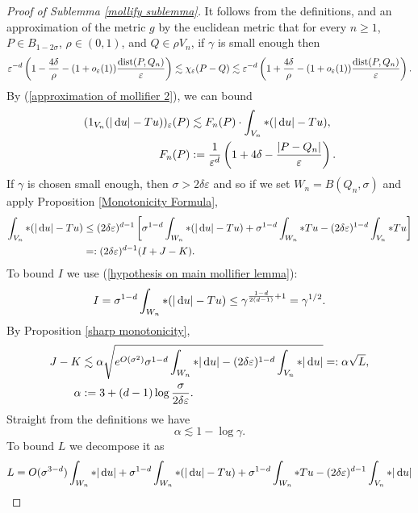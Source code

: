 \begin{proof}[Proof of Sublemma \ref{mollify sublemma}]
It follows from the definitions, and an approximation of the metric $g$ by the euclidean metric that for every $n \geq 1$, $P \in B_{1 - 2\sigma}$, $\rho \in (0, 1)$, and $Q \in \rho V_n$, if $\gamma$ is small enough then
\begin{equation}\label{approximation of mollifier 2}
\varepsilon^{-d}\left(1 - \frac{4\delta}{\rho} - (1 + o_\varepsilon(1))\frac{\operatorname{dist}(P, Q_n)}{\varepsilon}\right) \lesssim \chi_\varepsilon(P - Q) \lesssim \varepsilon^{-d}\left(1 + \frac{4\delta}{\rho} - (1 + o_\varepsilon(1))\frac{\operatorname{dist}(P, Q_n)}{\varepsilon}\right).
\end{equation}
By (\ref{approximation of mollifier 2}), we can bound
\begin{align*}
(1_{V_n}(|\mathop{}\!\mathrm{d} u| - Tu))_\varepsilon(P) &\lesssim F_n(P) \cdot \int_{V_n} *(|\mathop{}\!\mathrm{d} u| - Tu), \\
F_n(P) &:= \frac{1}{\varepsilon^d}\left(1 + 4\delta - \frac{|P - Q_n|}{\varepsilon}\right).
\end{align*}
If $\gamma$ is chosen small enough, then $\sigma > 2\delta\varepsilon$ and so if we set $W_n = B(Q_n, \sigma)$ and apply Proposition \ref{Monotonicity Formula},
\begin{align*}
\int_{V_n} *(|\mathop{}\!\mathrm{d} u| - Tu) &\leq (2\delta\varepsilon)^{d - 1}
 \left[\sigma^{1 - d}\int_{W_n} *(|\mathop{}\!\mathrm{d} u| - Tu) + \sigma^{1 - d}\int_{W_n} *Tu - (2\delta\varepsilon)^{1 - d}\int_{V_n} *Tu\right]\\
 &=: (2\delta\varepsilon)^{d - 1} (I + J - K).
\end{align*}
To bound $I$ we use (\ref{hypothesis on main mollifier lemma}):
$$I = \sigma^{1 - d}\int_{W_n} *(|\mathop{}\!\mathrm{d} u| - Tu) \leq \gamma^{\frac{1 - d}{2(d - 1)} + 1} = \gamma^{1/2}.$$
By Proposition \ref{sharp monotonicity},
\begin{align*}
J - K &\lesssim \alpha \sqrt{e^{O(\sigma^2)}\sigma^{1 - d} \int_{W_n} *|\mathop{}\!\mathrm{d} u| - (2\delta\varepsilon)^{1 - d} \int_{V_n} *|\mathop{}\!\mathrm{d} u|} =: \alpha \sqrt L,\\
\alpha &:= 3 + (d - 1) \log \frac{\sigma}{2\delta\varepsilon}.
\end{align*}
Straight from the definitions we have
$$\alpha \lesssim 1 - \log \gamma.$$
To bound $L$ we decompose it as 
\begin{align*}
L &= O(\sigma^{3 - d}) \int_{W_n} *|\dif u| + \sigma^{1 - d} \int_{W_n} *(|\dif u| - Tu) + \sigma^{1 - d} \int_{W_n} *Tu - (2\delta\varepsilon)^{d - 1} \int_{V_n} *|\dif u|\\

\end{align*}
\end{proof}
